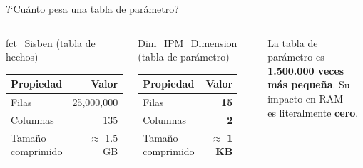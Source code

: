 \documentclass[aspectratio=169,10pt]{beamer}
\begin{document}
\begin{frame}{?`Cu\'anto pesa una tabla de par\'ametro?}

\begin{columns}[T]


\begin{block}{fct\_Sisben (tabla de hechos)}
\begin{tabular}{lr}
\toprule
Propiedad & Valor \\
\midrule
Filas     & 25{,}000{,}000 \\
Columnas  & 135 \\
Tama\~no comprimido & $\approx$ 1.5 GB \\
\bottomrule
\end{tabular}
\end{block}

\bigskip

\begin{block}{Dim\_IPM\_Dimension (tabla de par\'ametro)}
\begin{tabular}{lr}
\toprule
Propiedad & Valor \\
\midrule
Filas     & \textbf{15} \\
Columnas  & \textbf{2} \\
Tama\~no comprimido & $\approx$ \textbf{1 KB} \\
\bottomrule
\end{tabular}
\end{block}

\begin{center}
\end{center}

\bigskip
{\footnotesize
La tabla de par\'ametro es \textbf{1.500.000 veces\\m\'as peque\~na}.
Su impacto en RAM\\es literalmente \textbf{cero}.
}
\end{columns}

\end{frame}
\end{document}
